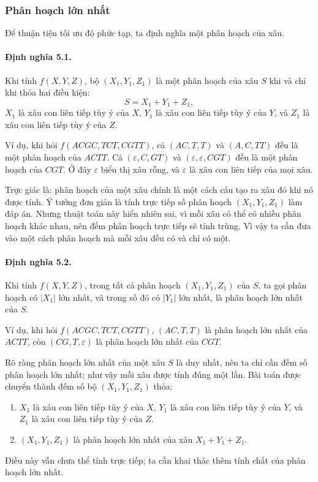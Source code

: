 \documentclass[11pt]{article}
\begin{document}
\subsubsection{Phân hoạch lớn nhất}

Để thuận tiện tối ưu độ phức tạp, ta định nghĩa một phân hoạch của xâu.

\paragraph{Định nghĩa 5.1.}
Khi tính \(f(X,Y,Z)\), bộ \((X_1,Y_1,Z_1)\) là một phân hoạch của xâu \(S\) khi
và chỉ khi thỏa hai điều kiện:
\[
  S=X_1+Y_1+Z_1,
\]
\(X_1\) là xâu con liên tiếp tùy ý của \(X\), \(Y_1\) là xâu con liên tiếp tùy
ý của \(Y\), và \(Z_1\) là xâu con liên tiếp tùy ý của \(Z\).

Ví dụ, khi hỏi \(f(ACGC,TCT,CGTT)\), cả \((AC,T,T)\) và \((A,C,TT)\) đều là
một phân hoạch của \(ACTT\). Cả \((\varepsilon,C,GT)\) và
\((\varepsilon,\varepsilon,CGT)\) đều là một phân hoạch của \(CGT\). Ở đây
\(\varepsilon\) biểu thị xâu rỗng, và \(\varepsilon\) là xâu con liên tiếp của
mọi xâu.

Trực giác là: phân hoạch của một xâu chính là một cách cấu tạo ra xâu đó khi
nó được tính. Ý tưởng đơn giản là tính trực tiếp số phân hoạch
\((X_1,Y_1,Z_1)\) làm đáp án. Nhưng thuật toán này hiển nhiên sai, vì mỗi xâu
có thể có nhiều phân hoạch khác nhau, nên đếm phân hoạch trực tiếp sẽ tính
trùng. Vì vậy ta cần đưa vào một cách phân hoạch mà mỗi xâu đều có và chỉ có
một.

\paragraph{Định nghĩa 5.2.}
Khi tính \(f(X,Y,Z)\), trong tất cả phân hoạch \((X_1,Y_1,Z_1)\) của \(S\), ta
gọi phân hoạch có \(|X_1|\) lớn nhất, và trong số đó có \(|Y_1|\) lớn nhất, là
phân hoạch lớn nhất của \(S\).

Ví dụ, khi hỏi \(f(ACGC,TCT,CGTT)\), \((AC,T,T)\) là phân hoạch lớn nhất của
\(ACTT\), còn \((CG,T,\varepsilon)\) là phân hoạch lớn nhất của \(CGT\).

Rõ ràng phân hoạch lớn nhất của một xâu \(S\) là duy nhất, nên ta chỉ cần đếm
số phân hoạch lớn nhất; như vậy mỗi xâu được tính đúng một lần. Bài toán được
chuyển thành đếm số bộ \((X_1,Y_1,Z_1)\) thỏa:
\begin{enumerate}
  \item \(X_1\) là xâu con liên tiếp tùy ý của \(X\), \(Y_1\) là xâu con liên
  tiếp tùy ý của \(Y\), và \(Z_1\) là xâu con liên tiếp tùy ý của \(Z\).
  \item \((X_1,Y_1,Z_1)\) là phân hoạch lớn nhất của xâu \(X_1+Y_1+Z_1\).
\end{enumerate}
Điều này vẫn chưa thể tính trực tiếp; ta cần khai thác thêm tính chất của
phân hoạch lớn nhất.
\end{document}
